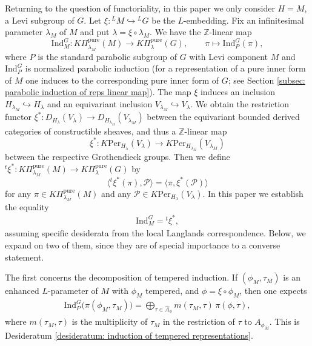 \documentclass[11pt,letterpaper]{amsart}
\newcommand{\Z}{\mathbb{Z}}
\newcommand{\irrepdual}[1]{\widehat{#1}}
\newcommand{\pure}{\mathrm{pure}}
\newcommand{\Ind}{\mathrm{Ind}}
\newcommand{\Per}{\mathrm{Per}}
\renewcommand{\1}{\mathbbm{1}}
\numberwithin{equation}{section}
\begin{document}
Returning to the question of functoriality, in this paper we only consider $H=M$, a Levi subgroup of $G$. Let $\xi: {}^L M \hookrightarrow {}^L G$ be the $L$-embedding. Fix an infinitesimal parameter $\lambda_M$ of $M$ and put $\lambda=\xi\circ\lambda_M$. We have the  $\Z$-linear map
\[\Ind_M^G:K\Pi^\pure_{\lambda_M}(M)\to K\Pi^\pure_{\lambda}(G),\qquad \pi \mapsto \Ind_P^G(\pi),\]
where $P$ is the standard parabolic subgroup of $G$ with Levi component $M$ and $\Ind_P^G$ is normalized parabolic induction (for a representation of a pure inner form of $M$ one induces to the corresponding pure inner form of $G$; see Section \ref{subsec: parabolic induction of reps linear map}). The map $\xi$ induces an inclusion $H_{\lambda_M} \hookrightarrow H_\lambda$ and an equivariant inclusion $V_{\lambda_M} \hookrightarrow V_\lambda$. We obtain the restriction functor $\xi^*:D_{H_\lambda}(V_\lambda) \to D_{H_{\lambda_M}}(V_{\lambda_M})$ between the equivariant bounded derived categories of constructible sheaves, and thus a $\Z$-linear map
\[\xi^*: K\Per_{H_\lambda}(V_\lambda) \to K\Per_{H_{\lambda_M}}(V_{\lambda_M})\]
between the respective Grothendieck groups. Then we define ${}^t\xi^* : K\Pi^\pure_{\lambda_M}(M)\to K\Pi^\pure_{\lambda}(G)$ by
\[ \langle {}^t\xi^*(\pi), \mathcal{P}\rangle=\langle \pi, \xi^*(\mathcal{P})\rangle\]
for any $\pi\in K\Pi_{\lambda_M}^\pure(M)$ and any $\mathcal{P}\in K\Per_{H_\lambda}(V_\lambda)$.
In this paper we establish the equality
 \begin{align}\label{eq ind res intro}
     \Ind_M^G={}^t\xi^*,
 \end{align}
 assuming specific desiderata from the local Langlands correspondence. Below, we expand on two of them, since they are of special importance to a converse statement. 

The first concerns the decomposition of tempered induction. If $(\phi_M, \tau_M)$ is an enhanced $L$-parameter of $M$ with $\phi_M$ tempered, and $\phi=\xi\circ\phi_M$, then one expects
\begin{align}\label{eq temp decomp intro}
\Ind_P^G\big(\pi(\phi_M,\tau_M)\big)=\bigoplus_{\tau\in \irrepdual{A}_\phi} m(\tau_M,\tau)\,\pi(\phi,\tau),
\end{align}
where $m(\tau_M,\tau)$ is the multiplicity of $\tau_M$ in the restriction of $\tau$ to $A_{\phi_M}$. This is Desideratum \ref{desideratum: induction of tempered representations}. 
\end{document}
